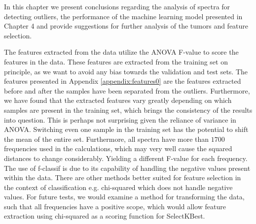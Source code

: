 
In this chapter we present conclusions regarding the analysis of spectra for detecting outliers, the performance of the machine learning model presented in Chapter 4 and provide suggestions for further analysis of the tumors and feature selection.

The features extracted from the data utilize the ANOVA F-value to score the features in the data. These features are extracted from the training set on principle, as we want to avoid any bias towards the validation and test sets. The features presented in Appendix \ref{appendix:features0} are the features extracted before and after the samples have been separated from the outliers. Furthermore, we have found that the extracted features vary greatly depending on which samples are present in the training set, which brings the consistency of the results into question. This is perhaps not surprising given the reliance of variance in ANOVA. Switching even one sample in the training set has the potential to shift the mean of the entire set. Furthermore, all spectra have more than $1700$ frequencies used in the calculations, which may very well cause the squared distances to change considerably. Yielding a different F-value for each frequency. The use of f-classif is due to its capability of handling the negative values present within the data. There are other methods better suited for feature selection in the context of classification e.g. chi-squared which does not handle negative values. For future tests, we would examine a method for transforming the data, such that all frequencies have a positive scope, which would allow feature extraction using chi-squared as a scoring function for SelectKBest.

